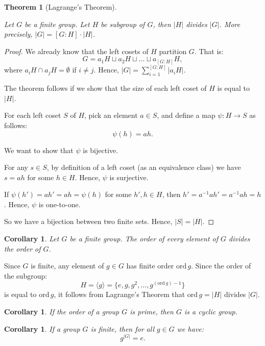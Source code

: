 \documentclass[a4paper,12pt]{report}
\newcommand{\abs}[1]{\left|#1\right|}
\newcommand{\ra}{\longrightarrow}
\newcommand{\ord}{\mathrm{ord}\,}
\renewcommand{\ord}{\mathrm{ord}\,}
\newcounter{statement}
\numberwithin{statement}{chapter}
\newtheorem{thm}[statement]{Theorem}
\newtheorem{cor}[statement]{Corollary}
\numberwithin{equation}{chapter}
\numberwithin{section}{chapter}
\numberwithin{subsection}{section}
\begin{document}
\begin{thm}[Lagrange's Theorem]

\label{lagrangethm}



Let $G$ be a finite group. Let $H$ be subgroup of $G$, then $\abs{H}$ divides $\abs{G}$.
More precisely, $\abs{G} = [G: H]\cdot\abs{H}$.
\end{thm}
\begin{proof}

We already know that the left cosets of $H$ partition $G$.
That is:
\[G = a_1 H \sqcup a_2 H \sqcup \ldots \sqcup a_{[G:H]}H,\]
where $a_i H \cap a_j H = \emptyset$ if $i \neq j$.
Hence, $\abs{G} = \sum_{i = 1}^{[G:H]} \abs{a_i H}$.





The theorem follows if we show that the size of each left coset of $H$ is equal to $\abs{H}$.




For each left coset $S$ of $H$, pick an element $a \in S$, and define a map
$\psi: H \ra S$ as follows:
\[\psi(h) = ah.\]

We want to show that $\psi$ is bijective.




For any $s \in S$,
by definition of a left coset (as an equivalence class) we have $s = ah$ for some $h \in H$.
Hence, $\psi$ is surjective.




If $\psi(h') = ah' = ah = \psi(h)$ for some $h', h \in H$,
then $h' = a^{-1}ah' = a^{-1}ah = h$. Hence, $\psi$ is one-to-one.




So we have a bijection between two finite sets. Hence, $\abs{S} = \abs{H}$.

\end{proof}

\begin{cor}
Let $G$ be a finite group.
The order of every element of $G$ divides the order of $G$.
\end{cor}
Since $G$ is finite, any element of $g \in G$ has finite order $\ord g$.
Since the order of the subgroup:
\[H = \langle g \rangle
= \{e, g, g^2, \ldots, g^{(\ord g) - 1}\}\]
is equal to $\ord g$,
it follows from Lagrange's Theorem that $\ord g = \abs{H}$ divides $\abs{G}$.
\begin{cor}

If the order of a group $G$ is prime, then $G$ is a cyclic group.
\end{cor}
\begin{cor}

If a group $G$ is finite, then for all $g \in G$ we have:
\[
g^{\abs{G}} = e.
\]
\end{cor}
\end{document}
